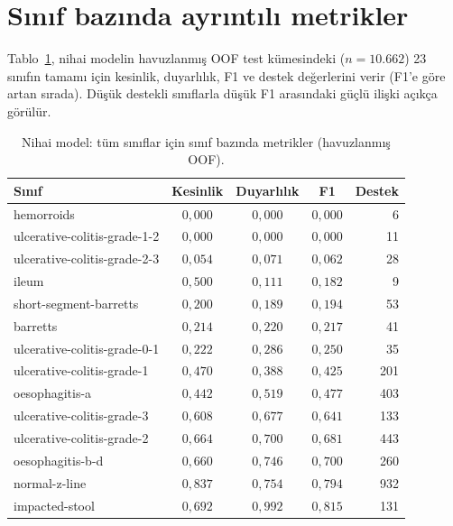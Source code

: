 \section{Sınıf bazında ayrıntılı metrikler}
\label{app:perclass}

Tablo~\ref{tab:perclass-full}, nihai modelin havuzlanmış OOF test kümesindeki
($n = 10{.}662$) 23 sınıfın tamamı için kesinlik, duyarlılık, F1 ve destek
değerlerini verir (F1'e göre artan sırada). Düşük destekli sınıflarla düşük F1
arasındaki güçlü ilişki açıkça görülür.

\begin{table}[H]
  \centering
  \footnotesize
  \caption{Nihai model: tüm sınıflar için sınıf bazında metrikler (havuzlanmış OOF).}
  \label{tab:perclass-full}
  \begin{tabular}{lcccr}
    \toprule
    Sınıf & Kesinlik & Duyarlılık & F1 & Destek \\
    \midrule
    hemorroids                     & $0{,}000$ & $0{,}000$ & $0{,}000$ & 6 \\
    ulcerative-colitis-grade-1-2   & $0{,}000$ & $0{,}000$ & $0{,}000$ & 11 \\
    ulcerative-colitis-grade-2-3   & $0{,}054$ & $0{,}071$ & $0{,}062$ & 28 \\
    ileum                          & $0{,}500$ & $0{,}111$ & $0{,}182$ & 9 \\
    short-segment-barretts         & $0{,}200$ & $0{,}189$ & $0{,}194$ & 53 \\
    barretts                       & $0{,}214$ & $0{,}220$ & $0{,}217$ & 41 \\
    ulcerative-colitis-grade-0-1   & $0{,}222$ & $0{,}286$ & $0{,}250$ & 35 \\
    ulcerative-colitis-grade-1     & $0{,}470$ & $0{,}388$ & $0{,}425$ & 201 \\
    oesophagitis-a                 & $0{,}442$ & $0{,}519$ & $0{,}477$ & 403 \\
    ulcerative-colitis-grade-3     & $0{,}608$ & $0{,}677$ & $0{,}641$ & 133 \\
    ulcerative-colitis-grade-2     & $0{,}664$ & $0{,}700$ & $0{,}681$ & 443 \\
    oesophagitis-b-d               & $0{,}660$ & $0{,}746$ & $0{,}700$ & 260 \\
    normal-z-line                  & $0{,}837$ & $0{,}754$ & $0{,}794$ & 932 \\
    impacted-stool                 & $0{,}692$ & $0{,}992$ & $0{,}815$ & 131 \\

\end{tabular}
\end{table}
